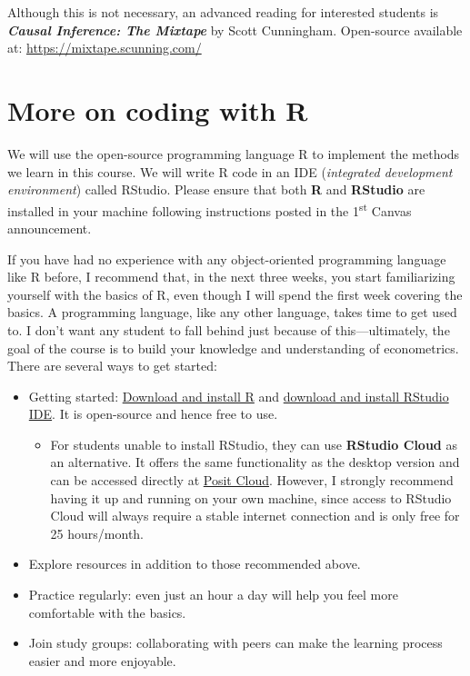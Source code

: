 \documentclass[11pt]{article}
\begin{document}
Although this is not necessary, an advanced reading for interested students is
\textbf{\emph{Causal Inference: The Mixtape}} by Scott Cunningham. Open-source
available at: \url{https://mixtape.scunning.com/}

\section{More on coding with R}

We will use the open-source programming language R to implement the methods we
learn in this course. We will write R code in an IDE (\emph{integrated
development environment}) called RStudio. Please ensure that both \textbf{R} and
\textbf{RStudio} are installed in your machine following instructions posted in
the 1\textsuperscript{st} Canvas announcement.

If you have had no experience with any object-oriented programming language like
R before, I recommend that, in the next three weeks, you start familiarizing
yourself with the basics of R, even though I will spend the first week covering
the basics. A programming language, like any other language, takes time to get
used to. I don't want any student to fall behind just because of this---ultimately,
the goal of the course is to build your knowledge and understanding of
econometrics. There are several ways to get started:

\begin{itemize}
  \item Getting started:
        \href{https://posit.co/download/rstudio-desktop/}{Download and install R}
        and
        \href{https://posit.co/download/rstudio-desktop/}{download and install
        RStudio IDE}. It is open-source and hence free to use.
        \begin{itemize}
          \item For students unable to install RStudio, they can use
                \textbf{RStudio Cloud} as an alternative. It offers the same
                functionality as the desktop version and can be accessed
                directly at \href{https://posit.cloud/}{Posit Cloud}. However, I
                strongly recommend having it up and running on your own machine,
                since access to RStudio Cloud will always require a stable
                internet connection and is only free for 25 hours/month.
        \end{itemize}
  \item Explore resources in addition to those recommended above.
  \item Practice regularly: even just an hour a day will help you feel more
        comfortable with the basics.
  \item Join study groups: collaborating with peers can make the learning
        process easier and more enjoyable.
\end{itemize}
\end{document}
